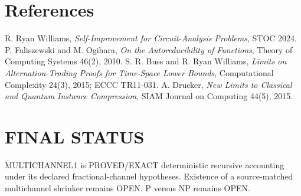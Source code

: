 \documentclass[11pt]{article}
\begin{document}
\section*{References}
R. Ryan Williams, \emph{Self-Improvement for Circuit-Analysis Problems}, STOC 2024.
P. Faliszewski and M. Ogihara, \emph{On the Autoreducibility of Functions}, Theory of Computing Systems 46(2), 2010.
S. R. Buss and R. Ryan Williams, \emph{Limits on Alternation-Trading Proofs for Time-Space Lower Bounds}, Computational Complexity 24(3), 2015; ECCC TR11-031.
A. Drucker, \emph{New Limits to Classical and Quantum Instance Compression}, SIAM Journal on Computing 44(5), 2015.

\section*{FINAL STATUS}
MULTICHANNEL1 is PROVED/EXACT deterministic recursive accounting under its declared fractional-channel hypotheses. Existence of a source-matched multichannel shrinker remains OPEN. P versus NP remains OPEN.

\end{document}
